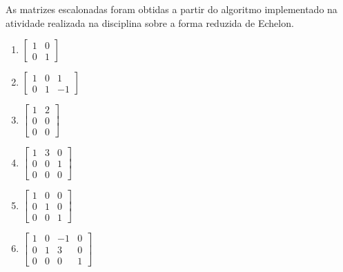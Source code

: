 \begin{resolution}
  As matrizes escalonadas foram obtidas a partir do algoritmo implementado na atividade realizada na disciplina sobre a forma reduzida de Echelon.
  \begin{multicols}{3}
    \begin{enumerate}[label=\alph*)]
      \item $\begin{bmatrix}
                1 & 0 \\ 0 & 1
              \end{bmatrix}$

      \item  $\begin{bmatrix}
                1 & 0 & 1  \\
                0 & 1 & -1
              \end{bmatrix}$

      \item  $\begin{bmatrix}
                1 & 2 \\ 0 & 0 \\ 0 & 0
              \end{bmatrix}$

      \item $\begin{bmatrix}
                1 & 3 & 0 \\
                0 & 0 & 1 \\
                0 & 0 & 0
              \end{bmatrix}$

      \item $\begin{bmatrix}
                1 & 0 & 0 \\
                0 & 1 & 0 \\
                0 & 0 & 1
              \end{bmatrix}$

      \item $\begin{bmatrix}
                1 & 0 & -1 & 0 \\
                0 & 1 & 3  & 0 \\
                0 & 0 & 0  & 1
              \end{bmatrix}$
    \end{enumerate}
  \end{multicols}
\end{resolution}


